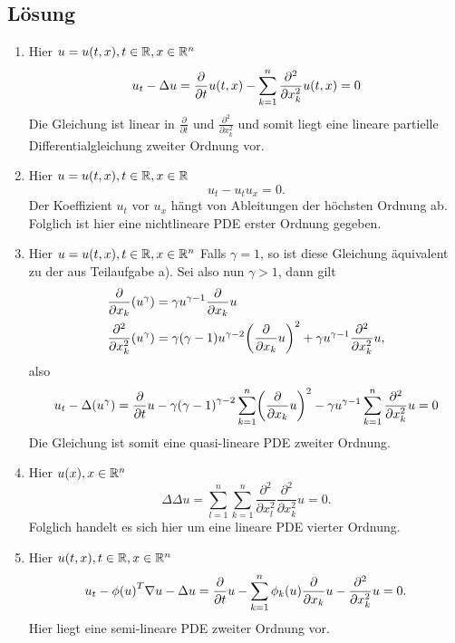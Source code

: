 \documentclass{exercise}
\begin{document}
    \subsection*{Lösung}
    \begin{enumerate}
        \item Hier \(u = u\parentheses*{t, x}, t \in \R, x \in \R^n\)
        \[
            u_t - \Delta u = \frac{\partial}{\partial t}u\parentheses*{t, x} - \sum_{k = 1}^n\frac{\partial^2}{\partial x_k^2}u\parentheses*{t, x} = 0
        \]
        Die Gleichung ist linear in \(\frac{\partial}{\partial t}\) und \(\frac{\partial^2}{\partial x_k^2}\) und somit liegt eine lineare partielle Differentialgleichung zweiter Ordnung vor.
        \item Hier \(u = u\parentheses*{t, x}, t \in \R, x \in \R\)
        \[
            u_t - u_tu_x = 0.
        \]
        Der Koeffizient \(u_t\) vor \(u_x\) hängt von Ableitungen der höchsten Ordnung ab.
        Folglich ist hier eine nichtlineare PDE erster Ordnung gegeben.
        \item Hier \(u = u\parentheses*{t, x}, t \in \R, x \in \R^n\)
        Falls \(\gamma = 1\), so ist diese Gleichung äquivalent zu der aus Teilaufgabe a).
        Sei also nun \(\gamma > 1\), dann gilt
        \begin{align*}
            \frac{\partial}{\partial x_k}\parentheses*{u^\gamma} &= \gamma u^{\gamma - 1}\frac{\partial}{\partial x_k}u\\
            \frac{\partial^2}{\partial x_k^2}\parentheses*{u^\gamma} &= \gamma\parentheses*{\gamma - 1}u^{\gamma - 2}\parentheses*{\frac{\partial}{\partial x_k}u}^2 + \gamma u^{\gamma - 1}\frac{\partial^2}{\partial x_k^2}u,
        \end{align*}
        also
        \[
            u_t - \Delta\parentheses*{u^\gamma} = \frac{\partial}{\partial t}u - \gamma\parentheses*{\gamma - 1}^{\gamma - 2}\sum_{k = 1}^n\parentheses*{\frac{\partial}{\partial x_k}u}^2 - \gamma u^{\gamma - 1}\sum_{k = 1}^{n}\frac{\partial^2}{\partial x_k^2}u = 0
        \]
        Die Gleichung ist somit eine quasi-lineare PDE zweiter Ordnung.
        \item Hier \(u\parentheses*{x}, x \in \R^n\)
        \[
            \Delta\Delta u = \sum_{l = 1}^n\sum_{k = 1}^n\frac{\partial^2}{\partial x_l^2}\frac{\partial^2}{\partial x_k^2}u = 0.
        \]
        Folglich handelt es sich hier um eine lineare PDE vierter Ordnung.
        \item Hier \(u\parentheses*{t, x}, t \in \R, x \in \R^n\)
        \[
            u_t - \phi\parentheses*{u}^T\nabla u - \Delta u = \frac{\partial}{\partial t}u - \sum_{k = 1}^n \phi_k\parentheses*{u}\frac{\partial}{\partial x_k}u - \frac{\partial^2}{\partial x_k^2}u = 0.
        \]
        Hier liegt eine semi-lineare PDE zweiter Ordnung vor.
    \end{enumerate}
\end{document}

